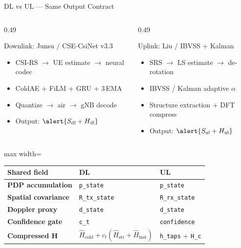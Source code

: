 \documentclass[aspectratio=169, 11pt]{beamer}
\begin{document}
\begin{frame}{DL vs UL — Same Output Contract}
\begin{columns}[T,onlytextwidth]
\begin{column}{0.49\textwidth}
\begin{block}{Downlink: Junsu / CSE-CsiNet v3.3}
\begin{itemize}
  \item CSI-RS $\to$ UE estimate $\to$ neural codec
  \item ColdAE + FiLM + GRU + 3\,EMA
  \item Quantize $\to$ air $\to$ gNB decode
  \item Output: $\alert{S_\text{dl} + H_\text{dl}}$
\end{itemize}
\end{block}
\end{column}
\begin{column}{0.49\textwidth}
\begin{block}{Uplink: Liu / IBVSS + Kalman}
\begin{itemize}
  \item SRS $\to$ LS estimate $\to$ de-rotation
  \item IBVSS / Kalman adaptive $\alpha$
  \item Structure extraction + DFT compress
  \item Output: $\alert{S_\text{ul} + H_\text{ul}}$
\end{itemize}
\end{block}
\end{column}
\end{columns}

\vspace{4pt}
\centering
\footnotesize
\begin{adjustbox}{max width=\linewidth}
\begin{tabular}{>{\bfseries}lll}
\toprule
Shared field & \textbf{DL} & \textbf{UL} \\
\midrule
PDP accumulation       & \texttt{p\_state}     & \texttt{p\_state} \\
Spatial covariance     & \texttt{R\_tx\_state}  & \texttt{R\_rx\_state} \\
Doppler proxy          & \texttt{d\_state}      & \texttt{d\_state} \\
Confidence gate        & \texttt{c\_t}          & \texttt{confidence} \\
Compressed H           & $\hat{H}_\text{cold} + c_t(\hat{H}_\text{str}{+}\hat{H}_\text{inst})$
                       & \texttt{h\_taps} + \texttt{H\_c} \\
\bottomrule
\end{tabular}
\end{adjustbox}
\end{frame}
\end{document}
